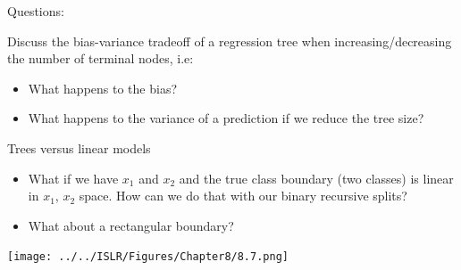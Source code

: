 \documentclass[10pt,ignorenonframetext,]{beamer}
\providecommand{\tightlist}{%
  \setlength{\itemsep}{0pt}\setlength{\parskip}{0pt}}
\begin{document}
\begin{frame}

\vspace{2mm}

\begin{block}{Questions:}

\vspace{2mm}

Discuss the bias-variance tradeoff of a regression tree when
increasing/decreasing the number of terminal nodes, i.e:

\begin{itemize}
\tightlist
\item
  What happens to the bias?
\item
  What happens to the variance of a prediction if we reduce the tree
  size?
\end{itemize}

\end{block}

\end{frame}

\begin{frame}{Trees versus linear models}

\begin{itemize}
\item
  What if we have \(x_1\) and \(x_2\) and the true class boundary (two
  classes) is linear in \(x_1\), \(x_2\) space. How can we do that with
  our binary recursive splits?
\item
  What about a rectangular boundary?
\end{itemize}

\centering
\texttt{[image: ../../ISLR/Figures/Chapter8/8.7.png]}

\end{frame}
\end{document}
